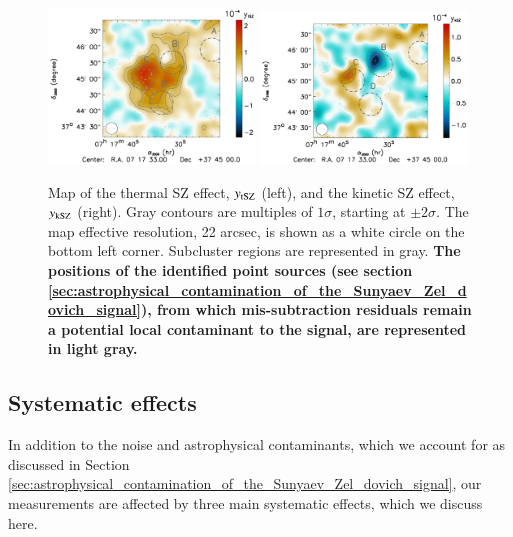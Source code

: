 \documentclass[twocolumn,traditabstract]{aa}
\begin{document}
\begin{figure}[h]
\centering
\includegraphics[width=0.49\textwidth]{Figure/MACSJ0717_tSZ_map.pdf}
\includegraphics[width=0.49\textwidth]{Figure/MACSJ0717_kSZ_map.pdf}
\caption{\footnotesize{Map of the thermal SZ effect, $y_{\rm tSZ}$ (left), and the kinetic SZ effect, $y_{\rm kSZ}$ (right). Gray contours are multiples of $1 \sigma$, starting at $\pm 2 \sigma$. The map effective resolution, 22 arcsec, is shown as a white circle on the bottom left corner. Subcluster regions are represented in gray. {\bf The positions of the identified point sources (see section \ref{sec:astrophysical_contamination_of_the_Sunyaev_Zel_dovich_signal}), from which mis-subtraction residuals remain a potential local contaminant to the signal, are represented in light gray.}}}
\label{fig:tSZ_kSZ_maps}
\end{figure}

\subsection{Systematic effects}
In addition to the noise and astrophysical contaminants, which we account for as discussed in Section \ref{sec:astrophysical_contamination_of_the_Sunyaev_Zel_dovich_signal}, our measurements are affected by three main systematic effects, which we discuss here.
\end{document}
